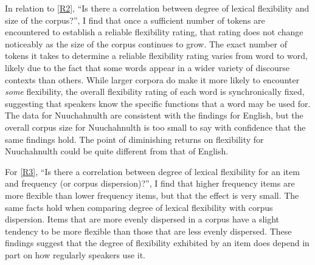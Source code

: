 In relation to \ref{R2}, \enquote{Is there a correlation between degree of lexical flexibility and size of the corpus?}, I find that once a sufficient number of tokens are encountered to establish a reliable flexibility rating, that rating does not change noticeably as the size of the corpus continues to grow. The exact number of tokens it takes to determine a reliable flexibility rating varies from word to word, likely due to the fact that some words appear in a wider variety of discourse contexts than others. While larger corpora do make it more likely to encounter \emph{some} flexibility, the overall flexibility rating of each word is synchronically fixed, suggesting that speakers know the specific functions that a word may be used for. The data for Nuuchahnulth are consistent with the findings for English, but the overall corpus size for Nuuchahnulth is too small to say with confidence that the same findings hold. The point of diminishing returns on flexibility for Nuuchahnulth could be quite different from that of English.

For \ref{R3}, \enquote{Is there a correlation between degree of lexical flexibility for an item and frequency (or corpus dispersion)?}, I find that higher frequency items are more flexible than lower frequency items, but that the effect is very small. The same facts hold when comparing degree of lexical flexibility with corpus dispersion. Items that are more evenly dispersed in a corpus have a slight tendency to be more flexible than those that are less evenly dispersed. These findings suggest that the degree of flexibility exhibited by an item does depend in part on how regularly speakers use it.

